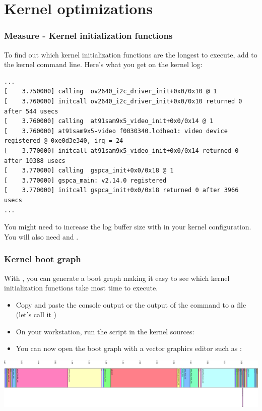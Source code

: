 \section{Kernel optimizations}

\begin{frame}[fragile]
\frametitle{Measure - Kernel initialization functions}
To find out which kernel initialization functions are the longest to
execute, add  to the kernel command line.
Here's what you get on the kernel log:
\begin{block}{}
\tiny
\begin{verbatim}
...
[    3.750000] calling  ov2640_i2c_driver_init+0x0/0x10 @ 1
[    3.760000] initcall ov2640_i2c_driver_init+0x0/0x10 returned 0 after 544 usecs
[    3.760000] calling  at91sam9x5_video_init+0x0/0x14 @ 1
[    3.760000] at91sam9x5-video f0030340.lcdheo1: video device registered @ 0xe0d3e340, irq = 24
[    3.770000] initcall at91sam9x5_video_init+0x0/0x14 returned 0 after 10388 usecs
[    3.770000] calling  gspca_init+0x0/0x18 @ 1
[    3.770000] gspca_main: v2.14.0 registered
[    3.770000] initcall gspca_init+0x0/0x18 returned 0 after 3966 usecs
...
\end{verbatim}
\end{block}
You might need to increase the log buffer size with
 in your kernel configuration. You will
also need  and .
\end{frame}

\begin{frame}
\frametitle{Kernel boot graph}
With , you can generate a boot graph
making it easy to see which kernel initialization functions
take most time to execute.
\begin{itemize}
\item Copy and paste the console output or the output of
      the  command to a file (let's call it )
\item On your workstation, run the  script
      in the kernel sources: \\
\item You can now open the boot graph with a vector graphics
      editor such as :
\end{itemize}
\begin{center}
    \includegraphics[width=\textwidth]{slides/boot-time-kernel/boot.png}
\end{center}
\end{frame}

